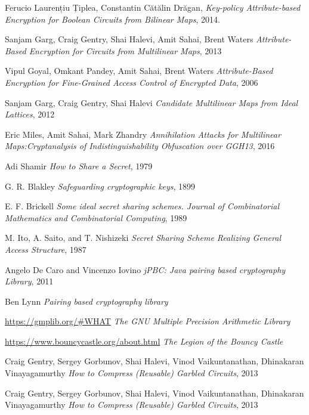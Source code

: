 \documentclass[12pt]{article}
\begin{document}
\begin{thebibliography}{9}

Ferucio Laurențiu Țiplea, Constantin Cătălin Drăgan, 
\textit{Key-policy Attribute-based Encryption for Boolean Circuits from Bilinear Maps}, 2014.

Sanjam Garg, Craig Gentry, Shai Halevi, Amit Sahai, Brent Waters 
\textit{Attribute-Based Encryption for Circuits from Multilinear Maps}, 2013
 
Vipul Goyal, Omkant Pandey, Amit Sahai, Brent Waters 
\textit{Attribute-Based Encryption for Fine-Grained Access Control of Encrypted Data}, 2006

Sanjam Garg, Craig Gentry, Shai Halevi
\textit{Candidate Multilinear Maps from Ideal Lattices}, 2012

Eric Miles, Amit Sahai, Mark Zhandry
\textit{Annihilation Attacks for Multilinear Maps:Cryptanalysis of Indistinguishability Obfuscation over GGH13}, 2016

Adi Shamir
\textit{How to Share a Secret}, 1979

G. R. Blakley
\textit{Safeguarding cryptographic keys}, 1899

E. F. Brickell
\textit{Some ideal secret sharing schemes. Journal of Combinatorial Mathematics and Combinatorial Computing}, 1989

M. Ito, A. Saito, and T. Nishizeki
\textit{Secret Sharing Scheme Realizing General Access Structure}, 1987

Angelo {De Caro} and Vincenzo Iovino
\textit{jPBC: Java pairing based cryptography Library}, 2011

Ben Lynn
\textit{Pairing based cryptography library}

\href{https://gmplib.org/\#WHAT}{https://gmplib.org/\#WHAT}
\textit{The GNU Multiple Precision Arithmetic Library}

\href{https://www.bouncycastle.org/about.html}{https://www.bouncycastle.org/about.html}
\textit{The Legion of the Bouncy Castle}

Craig Gentry, Sergey Gorbunov, Shai Halevi, Vinod Vaikuntanathan, Dhinakaran Vinayagamurthy
\textit{How to Compress (Reusable) Garbled Circuits}, 2013

Craig Gentry, Sergey Gorbunov, Shai Halevi, Vinod Vaikuntanathan, Dhinakaran Vinayagamurthy
\textit{How to Compress (Reusable) Garbled Circuits}, 2013


\end{thebibliography}
\end{document}
